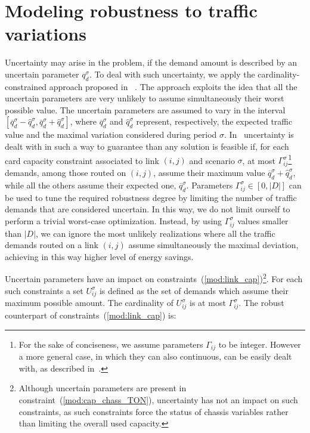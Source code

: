 \documentclass[final,5p,times,twocolumn]{elsarticle}
\begin{document}
\section{Modeling robustness to traffic variations}\label{sec:robust}
Uncertainty may arise in the problem, if the demand amount is described by an uncertain parameter  $q_d^{\sigma}$. To deal with such uncertainty, we apply the cardinality-constrained approach proposed in~ \cite{bertsimas11}. The approach exploits the idea that all the uncertain parameters are very unlikely to assume simultaneously their worst possible value.  The uncertain parameters are assumed to vary in the interval $ \left[\overline{q}_d^{\sigma} - \hat{q}_d^{\sigma},\overline{q}_d^{\sigma} + \hat{q}_d^{\sigma} \right]$, where $\overline{q}_d^{\sigma}$ and $\hat{q}_d^{\sigma}$ represent, respectively, the expected traffic value and the maximal variation considered during period $\sigma$. In~\cite{bertsimas11} uncertainty is dealt with in such a way to guarantee than any solution is
feasible if, for each card capacity constraint associated to link $(i,j)$ and scenario $\sigma$, at most $\Gamma_{ij}^\sigma$\footnote{For the sake of conciseness, we assume parameters $\Gamma_{ij}$ to be integer. However a more general case, in which they can also continuous, can be easily dealt with, as described in~\cite{bertsimas11}.} demands, among those routed on $(i,j)$, assume their maximum value $\overline{q}_d^{\sigma} + \hat{q}_d^{\sigma}$, while all the others assume their expected one, $\overline{q}_d^{\sigma}$. 
Parameters $\Gamma_{ij}^{\sigma} \in \left[0,|D|\right] $ can be used to tune the required robustness degree by limiting the number of traffic demands that are considered uncertain. In this way, we do not limit ourself to perform a trivial worst-case optimization. Instead, by using $\Gamma_{ij}^{\sigma}$ values smaller than $|D|$, we can ignore the most unlikely realizations where all the traffic demands routed on a link $(i,j)$ assume simultaneously the maximal deviation, achieving in this way higher level of energy savings.

Uncertain parameters have an impact on constraints~(\ref{mod:link_cap})\footnote{Although uncertain parameters are present in constraint~(\ref{mod:cap_chass_TON}), uncertainty has not an impact on such constraints, as such constraints force the status of chassis variables rather than limiting the overall used capacity.}. For each such constraints a set  $U_{ij}^{\sigma}$ is defined as the set of demands which assume their maximum possible amount. The cardinality of $U_{ij}^{\sigma}$ is at most $\Gamma^{\sigma}_{ij}$. The robust counterpart of constraints~(\ref{mod:link_cap}) is:
\end{document}
